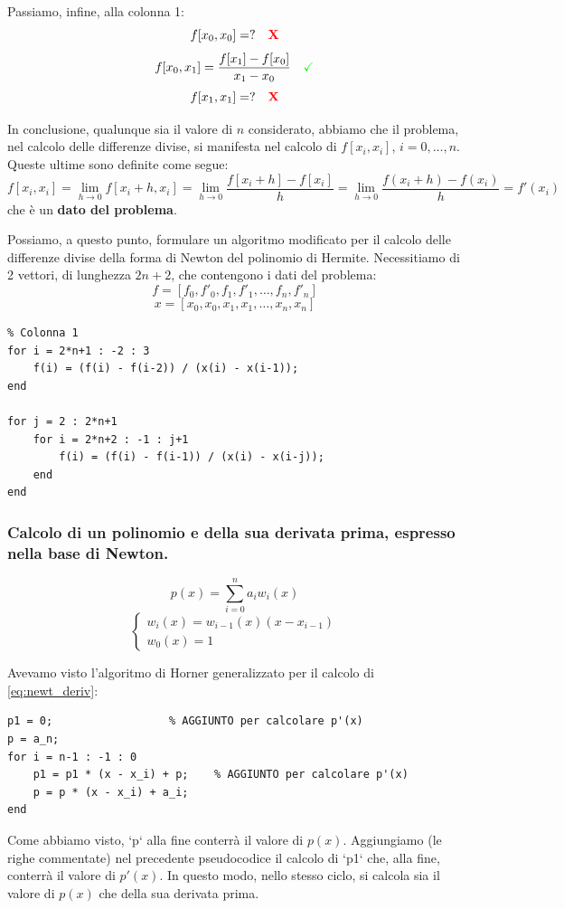 Passiamo, infine, alla colonna 1:
$$ f[x_0, x_0] = ? \quad \text{\textcolor{red}{\textbf{X}}} $$
$$ f[x_0, x_1] = \frac{f[x_1] - f[x_0]}{x_1 - x_0} \quad \text{\textcolor{green}{\checkmark}} $$
$$ f[x_1, x_1] = ? \quad \text{\textcolor{red}{\textbf{X}}} $$

In conclusione, qualunque sia il valore di $n$ considerato, abbiamo che il problema, nel calcolo delle differenze divise, si manifesta nel calcolo di $f[x_i, x_i]$, $i=0, \dots, n$.
Queste ultime sono definite come segue:
$$ f[x_i, x_i] = \lim_{h \to 0} f[x_i+h, x_i] = \lim_{h \to 0} \frac{f[x_i+h] - f[x_i]}{h} = \lim_{h \to 0} \frac{f(x_i+h) - f(x_i)}{h} = f'(x_i) $$
che è un \textbf{dato del problema}.

Possiamo, a questo punto, formulare un algoritmo modificato per il calcolo delle differenze divise della forma di Newton del polinomio di Hermite. Necessitiamo di 2 vettori, di lunghezza $2n+2$, che contengono i dati del problema:
$$ f = [f_0, f'_0, f_1, f'_1, \dots, f_n, f'_n] $$
$$ x = [x_0, x_0, x_1, x_1, \dots, x_n, x_n] $$

\begin{verbatim}
% Colonna 1
for i = 2*n+1 : -2 : 3
    f(i) = (f(i) - f(i-2)) / (x(i) - x(i-1));
end

for j = 2 : 2*n+1
    for i = 2*n+2 : -1 : j+1
        f(i) = (f(i) - f(i-1)) / (x(i) - x(i-j));
    end
end
\end{verbatim}

\vspace{0.4cm}
\subsubsection*{Calcolo di un polinomio e della sua derivata prima, espresso nella base di Newton.}
\begin{equation} \label{eq:newt_deriv}
p(x) = \sum_{i=0}^{n} a_i w_i(x)
\end{equation}
$$
\begin{cases}
w_i(x) = w_{i-1}(x)(x - x_{i-1}) \\
w_0(x) = 1
\end{cases}
$$

Avevamo visto l'algoritmo di Horner generalizzato per il calcolo di \eqref{eq:newt_deriv}:
\begin{verbatim}
p1 = 0;                  % AGGIUNTO per calcolare p'(x)
p = a_n;
for i = n-1 : -1 : 0
    p1 = p1 * (x - x_i) + p;    % AGGIUNTO per calcolare p'(x)
    p = p * (x - x_i) + a_i;
end
\end{verbatim}
Come abbiamo visto, `p` alla fine conterrà il valore di $p(x)$. Aggiungiamo (le righe commentate) nel precedente pseudocodice il calcolo di `p1` che, alla fine, conterrà il valore di $p'(x)$. In questo modo, nello stesso ciclo, si calcola sia il valore di $p(x)$ che della sua derivata prima.

